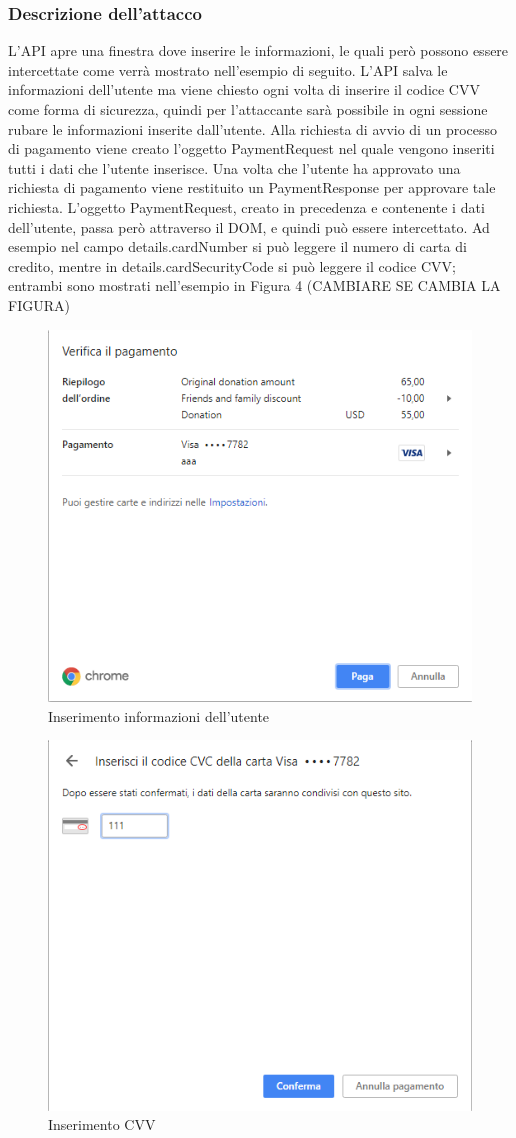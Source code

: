 \documentclass[11pt ,a4paper , twoside , openright ]{article}
\begin{document}
	\subsubsection{Descrizione dell'attacco}
	L'API apre una finestra dove inserire le informazioni, le quali però possono essere intercettate come verrà mostrato nell'esempio di seguito. 
	L'API salva le informazioni dell'utente ma viene chiesto ogni volta di inserire il codice CVV come forma di sicurezza, quindi per l'attaccante sarà possibile in ogni sessione rubare le informazioni inserite dall'utente.
	Alla richiesta di avvio di un processo di pagamento viene creato l'oggetto PaymentRequest nel quale vengono inseriti tutti i dati che l'utente inserisce. Una volta che l'utente ha approvato una richiesta di pagamento viene restituito un PaymentResponse per approvare tale richiesta. L'oggetto PaymentRequest, creato in precedenza e contenente i dati dell'utente, passa però attraverso il DOM, e quindi può essere intercettato. Ad esempio nel campo details.cardNumber si può leggere il numero di carta di credito, mentre in details.cardSecurityCode si può leggere il codice CVV; entrambi sono mostrati nell'esempio in Figura 4 (CAMBIARE SE CAMBIA LA FIGURA)
	\begin{figure}[h]
		\centering
		\includegraphics[width=0.5\linewidth]{Chrome1}
		\caption{Inserimento informazioni dell'utente}
		\label{fig: Inserimento informazioni dell'utente}
	\end{figure}
	\begin{figure}[h]
		\centering
		\includegraphics[width=0.5\linewidth]{Chrome2}
		\caption{Inserimento CVV}
		\label{fig: Inserimento CVV}
	\end{figure}
\end{document}

